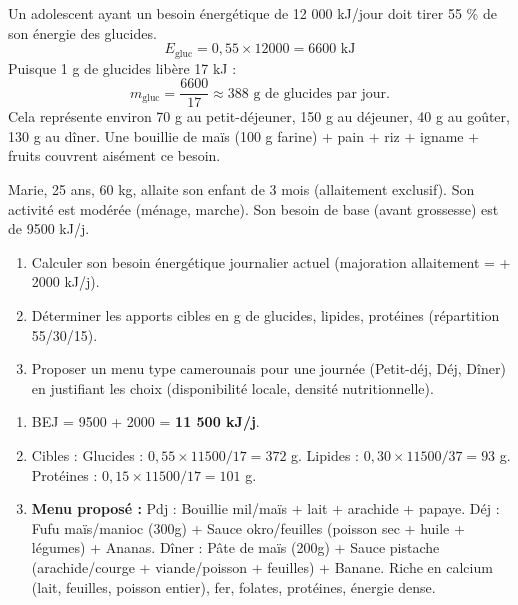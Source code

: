 \documentclass[11pt]{article}
\newcounter{popsec}
\newcounter{popsub}
\newcommand{\courssub}[1]{%
  \stepcounter{popsub}%
  \par\vspace{9pt}\noindent{\popxbold\fontsize{11.5}{13}\selectfont\color{popink}{\color{poporange}\thepopsec.\thepopsub}\hspace{6pt}#1}\par\nopagebreak\vspace{4pt}
}
\begin{document}
\begin{exemplebox}
Un adolescent ayant un besoin énergétique de 12 000 kJ/jour doit tirer 55 \% de son énergie des glucides.
\[ E_{\text{gluc}} = 0,55 \times 12000 = 6600 \text{ kJ} \]
Puisque 1 g de glucides libère 17 kJ :
\[ m_{\text{gluc}} = \frac{6600}{17} \approx 388 \text{ g de glucides par jour}. \]
Cela représente environ 70 g au petit-déjeuner, 150 g au déjeuner, 40 g au goûter, 130 g au dîner. Une bouillie de maïs (100 g farine) + pain + riz + igname + fruits couvrent aisément ce besoin.
\end{exemplebox}

\courssub{Exercices d'application}

\begin{exercice}
Marie, 25 ans, 60 kg, allaite son enfant de 3 mois (allaitement exclusif). Son activité est modérée (ménage, marche). Son besoin de base (avant grossesse) est de 9500 kJ/j.
\begin{enumerate}
    \item Calculer son besoin énergétique journalier actuel (majoration allaitement = + 2000 kJ/j).
    \item Déterminer les apports cibles en g de glucides, lipides, protéines (répartition 55/30/15).
    \item Proposer un menu type camerounais pour une journée (Petit-déj, Déj, Dîner) en justifiant les choix (disponibilité locale, densité nutritionnelle).
\end{enumerate}
\end{exercice}

\begin{corrige}[Exercice n°1]
\begin{enumerate}
    \item BEJ = 9500 + 2000 = \textbf{11 500 kJ/j}.
    \item Cibles : Glucides : $0,55 \times 11500 / 17 = 372$ g. Lipides : $0,30 \times 11500 / 37 = 93$ g. Protéines : $0,15 \times 11500 / 17 = 101$ g.
    \item \textbf{Menu proposé :} Pdj : Bouillie mil/maïs + lait + arachide + papaye. Déj : Fufu maïs/manioc (300g) + Sauce okro/feuilles (poisson sec + huile + légumes) + Ananas. Dîner : Pâte de maïs (200g) + Sauce pistache (arachide/courge + viande/poisson + feuilles) + Banane. Riche en calcium (lait, feuilles, poisson entier), fer, folates, protéines, énergie dense.
\end{enumerate}
\end{corrige}
\end{document}
